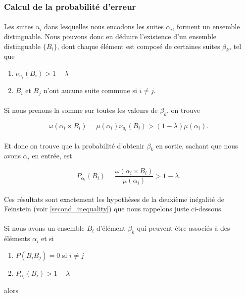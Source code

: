 \subsubsection*{Calcul de la probabilité d'erreur}
	
	\paragraph{}
	Les suites $u_i$ dans lesquelles nous encodons les suites $\alpha_i$,
	forment un ensemble distinguable. Nous pouvons donc en déduire l'existence
	d'un ensemble distinguable $\{B_i\}$, dont chaque élément est composé de 
	certaines suites $\beta_k$, tel que 
	\begin{enumerate}
		\item $\nu_{u_i}(B_i) > 1-\lambda$
		\item $B_i$ et $B_j$ n'ont aucune suite commune si $i\neq j$.
	\end{enumerate}
	
	\paragraph{}Si nous prenons la somme sur toutes les valeurs de $\beta_k$,
	on trouve
	
	\[
		\omega(\alpha_i \times B_i)=
		\mu(\alpha_i)\nu_{u_i}(B_i)>(1-\lambda)\mu(\alpha_i).
	\]
	
	\paragraph{}
	Et donc on trouve que la probabilité d'obtenir $\beta_k$ en sortie,
	sachant que nous avons $\alpha_i$ en entrée, est
	
	\[
		P_{\alpha_i}(B_i)=
		\frac{\omega(\alpha_i \times B_i)}{\mu(\alpha_i)}>1-\lambda.
	\]
	
	\paragraph{}
	Ces résultats sont exactement les hypothèses de la deuxième inégalité 
	de Feinstein (voir \ref{second_inequality}) 
	que nous rappelons juste ci-dessous.
	
	\paragraph{}
	Si nous avons un ensemble $B_i$ d'élément $\beta_k$ qui peuvent être
	associés à des éléments $\alpha_i$ et si 
	\begin{enumerate}
		\item $P(B_iB_j)=0$ si $i\neq j$
		\item $P_{\alpha_i}(B_i)>1-\lambda$
	\end{enumerate}
	alors 
	
